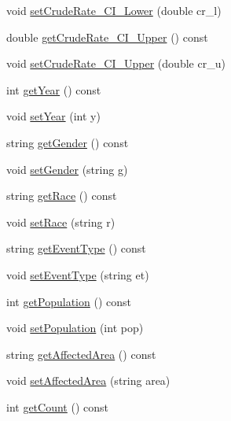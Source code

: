 \begin{DoxyCompactItemize}
\item 
void \hyperlink{classbridges_1_1_cancer_incidence_a58cdb11fa6e8d2766d3ef98b1e8aea1f}{set\+Crude\+Rate\+\_\+\+C\+I\+\_\+\+Lower} (double cr\+\_\+l)
\item 
double \hyperlink{classbridges_1_1_cancer_incidence_a0279f67ef72c3b175b2826c95ad40fe7}{get\+Crude\+Rate\+\_\+\+C\+I\+\_\+\+Upper} () const 
\item 
void \hyperlink{classbridges_1_1_cancer_incidence_a40d654a767d9b20ffa6931591d96d42a}{set\+Crude\+Rate\+\_\+\+C\+I\+\_\+\+Upper} (double cr\+\_\+u)
\item 
int \hyperlink{classbridges_1_1_cancer_incidence_ac2bd1a22a450657f2bd66b4d396bbba7}{get\+Year} () const 
\item 
void \hyperlink{classbridges_1_1_cancer_incidence_ac4c0d949ebb21dd890afe2714962fa5a}{set\+Year} (int y)
\item 
string \hyperlink{classbridges_1_1_cancer_incidence_af6105f18be298edff9b29b73bc3e1c81}{get\+Gender} () const 
\item 
void \hyperlink{classbridges_1_1_cancer_incidence_a994fbc9eb92c2d49b1b93a2eb904f2d8}{set\+Gender} (string g)
\item 
string \hyperlink{classbridges_1_1_cancer_incidence_a6e3850afa2162bee89ab5b8fa8462ddc}{get\+Race} () const 
\item 
void \hyperlink{classbridges_1_1_cancer_incidence_a9301e1c0bbf37aeccb74064aafd2d5e9}{set\+Race} (string r)
\item 
string \hyperlink{classbridges_1_1_cancer_incidence_a14696225e64e30c88415f9436ec9c0ac}{get\+Event\+Type} () const 
\item 
void \hyperlink{classbridges_1_1_cancer_incidence_a5b8a7ac53de10c878f0571a7ee17f3a6}{set\+Event\+Type} (string et)
\item 
int \hyperlink{classbridges_1_1_cancer_incidence_a1667cd51355846ea7a746d120a7749f1}{get\+Population} () const 
\item 
void \hyperlink{classbridges_1_1_cancer_incidence_aaade0295abaeeabb23b9e03d5ffd364a}{set\+Population} (int pop)
\item 
string \hyperlink{classbridges_1_1_cancer_incidence_a0e64c2b77342aa72bcd0a460a9b994e0}{get\+Affected\+Area} () const 
\item 
void \hyperlink{classbridges_1_1_cancer_incidence_a9872d7a2e82ff0f7a676efe46d383d71}{set\+Affected\+Area} (string area)
\item 
int \hyperlink{classbridges_1_1_cancer_incidence_a9d75ff868d631db828ad2eb22f6f90b4}{get\+Count} () const 

\end{DoxyCompactItemize}
